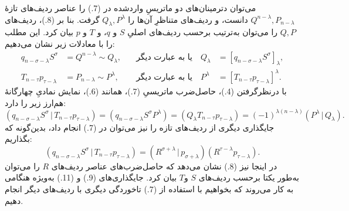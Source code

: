 \documentclass[11pt]{article}
\providecommand{\pair}[2]{(#1\,|\,#2)}
\begin{document}
می‌توان دترمینان‌های دو ماتریسِ واردشده در (7.) را عناصر ردیف‌های تازهٔ $Q^{n-\lambda},P_{n-\lambda}$ دانست، و ردیف‌های متناظرِ آن‌ها را $Q_\lambda,P^\lambda$ گرفت. بنا بر (8.)، ردیف‌های $Q,P$ را می‌توان به‌ترتیب برحسب ردیف‌های اصلیِ $S$ و $q$، و $T$ و $p$ بیان کرد. این مطلب را با معادلات زیر نشان می‌دهیم:
\begin{equation}
\begin{aligned}
 q_{n-\sigma-\lambda}S^\sigma&=Q^{n-\lambda}\sim Q_\lambda, &\quad\text{یا به عبارت دیگر}\quad Q_\lambda&=[q_{n-\sigma-\lambda}S^\sigma]_\lambda,\\
 T_{n-\tau}p_{\tau-\lambda}&=P_{n-\lambda}\sim P^\lambda, &\quad\text{یا به عبارت دیگر}\quad P^\lambda&=[T_{n-\tau}p_{\tau-\lambda}]^\lambda.
\end{aligned}
\tag{9}
\end{equation}
با درنظرگرفتن (4.)، حاصل‌ضرب ماتریسیِ (7.)، همانند (6.)، نمایش نمادیِ چهارگانهٔ هم‌ارز زیر را دارد:
\begin{equation}
\pair{q_{n-\sigma-\lambda}S^\sigma}{T_{n-\tau}p_{\tau-\lambda}}
=(q_{n-\sigma-\lambda}S^\sigma P^\lambda)=(Q_\lambda T_{n-\tau}p_{\tau-\lambda})=(-1)^{\lambda(n-\lambda)}\pair{P^\lambda}{Q_\lambda}.
\tag{10}
\end{equation}
جایگذاری دیگری از ردیف‌های تازه را نیز می‌توان در (7.) انجام داد، بدین‌گونه که بگذاریم:
\begin{equation}
 \pair{q_{n-\sigma-\lambda}S^\sigma}{T_{n-\tau}p_{\tau-\lambda}}
 =\pair{R^{\sigma+\lambda}}{p_{\sigma+\lambda}}(R^{\tau-\lambda}p_{\tau-\lambda}).
\tag{11}
\end{equation}
در اینجا نیز (8.) نشان می‌دهد که حاصل‌ضرب‌های عناصر ردیف‌های $R$ را می‌توان به‌طور یکتا برحسب ردیف‌های $S$ و$T$ بیان کرد. جایگذاری‌های (9.) و (11.) به‌ویژه هنگامی به کار می‌روند که بخواهیم با استفاده از (7.) تاخوردگی دیگری با ردیف‌های دیگر انجام دهیم.
\end{document}
